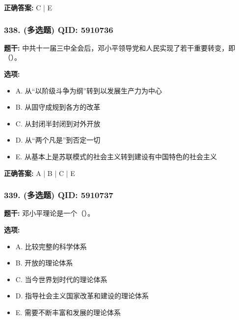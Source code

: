 \documentclass[12pt,UTF8]{ctexart}
\begin{document}
\textbf{正确答案:}
C | E

\vspace{0.3em}\hrulefill\vspace{0.7em}

\subsubsection*{338. (多选题) \small QID: 5910736}

\textbf{题干:}
中共十一届三中全会后，邓小平领导党和人民实现了若干重要转变，即（）。

\textbf{选项:}
\begin{itemize}[leftmargin=*]

  \item A. 从“以阶级斗争为纲”转到以发展生产力为中心

  \item B. 从固守成规到各方的改革

  \item C. 从封闭半封闭到对外开放

  \item D. 从“两个凡是”到否定一切

  \item E. 从基本上是苏联模式的社会主义转到建设有中国特色的社会主义

\end{itemize}

\textbf{正确答案:}
A | B | C | E

\vspace{0.3em}\hrulefill\vspace{0.7em}

\subsubsection*{339. (多选题) \small QID: 5910737}

\textbf{题干:}
邓小平理论是一个（）。

\textbf{选项:}
\begin{itemize}[leftmargin=*]

  \item A. 比较完整的科学体系

  \item B. 开放的理论体系

  \item C. 当今世界划时代的理论体系

  \item D. 指导社会主义国家改革和建设的理论体系

  \item E. 需要不断丰富和发展的理论体系

\end{itemize}
\end{document}
